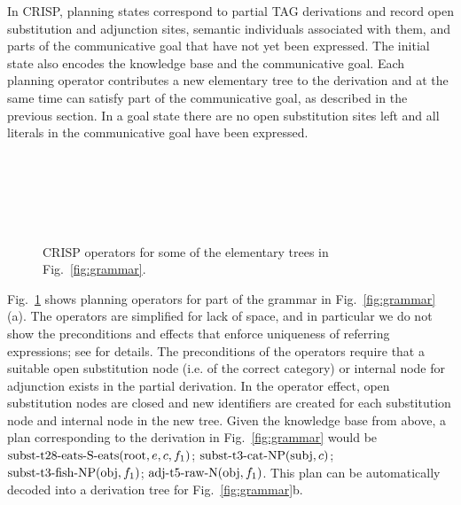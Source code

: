 In CRISP, planning states correspond to partial TAG derivations and record open substitution and adjunction sites, semantic individuals associated with them, and parts of the communicative goal that have not yet been expressed.  The initial state also encodes the knowledge base and the communicative goal. Each planning operator contributes a new elementary tree to the derivation and at the same time can satisfy part of the communicative goal, as described in the previous section. In a goal state there are no open substitution sites left and all literals in the communicative goal have been expressed. 
\begin{figure}[t]
\begin{center}
\\\smallskip

\\ \smallskip


\\\smallskip
\end{center}
\caption{\label{fig:crisp-operators} CRISP operators for some of the elementary trees in Fig.~\ref{fig:grammar}.}
\end{figure}


Fig.~\ref{fig:crisp-operators} shows planning operators for part of the grammar in Fig.~\ref{fig:grammar}(a). The operators are simplified for lack of space, and in particular we do not show the preconditions and effects that enforce uniqueness of referring expressions; see  for details.  The preconditions of the operators require that a suitable open substitution node (i.e. of the correct category) or internal node for adjunction exists in the partial derivation. In the operator effect, open substitution nodes are closed and new identifiers are created for each substitution node and internal node in the new tree. Given the knowledge base from above, a plan corresponding to the derivation in Fig.~\ref{fig:grammar} would be $\mbox{subst-t28-eats-S-eats}(\mbox{root}, e, c, f_1)$; $\mbox{subst-t3-cat-NP}(\mbox{subj},c)$; $\mbox{subst-t3-fish-NP}(\mbox{obj},f_1)$; $\mbox{adj-t5-raw-N}(\mbox{obj}, f_1)$. This plan can be automatically decoded into a derivation tree for Fig.~\ref{fig:grammar}b.

